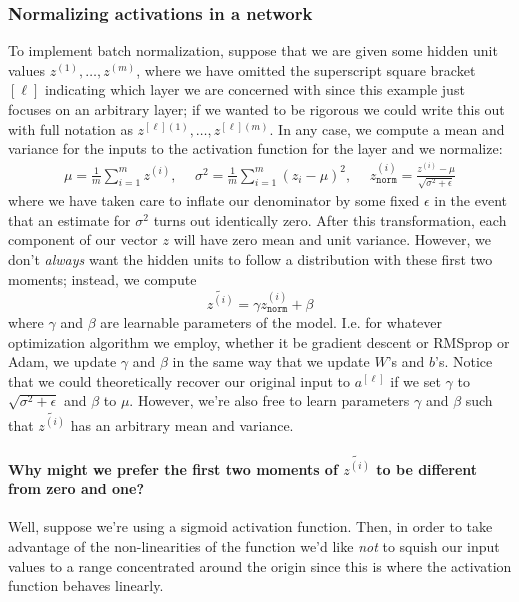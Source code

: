 \documentclass[12pt]{article}
\begin{document}
\subsubsection{Normalizing activations in a network} 
To implement batch normalization, suppose that we are given some
hidden unit values $z^{(1)}, \ldots, z^{(m)}$, where we have omitted the superscript square bracket $[\ell]$ indicating
which layer we are concerned with since this example just focuses on an arbitrary layer; if we wanted to be rigorous we could write this out with full notation as $z^{[\ell](1)}, \ldots, z^{[\ell](m)}$. In any case, we compute a mean and variance for the inputs to the activation function for the layer and we normalize:
\begin{align*}   \mu = \frac{1}{m} \sum_{i=1}^{m} z^{(i)}, \hspace{15pt}
  \sigma^2 = \frac{1}{m} \sum_{i=1}^m \left(z_i - \mu\right)^2, \hspace{15pt}
  z^{(i)}_{\texttt{norm}} = \frac{z^{(i)} - \mu}{\sqrt{\sigma^2 + \epsilon}} \end{align*}
where we have taken care to inflate our denominator by some fixed $\epsilon$ in the event that an estimate for
$\sigma^2$ turns out identically zero. After this transformation, each component of our vector $z$ will have 
zero mean and unit variance. However, we don't \emph{always} want the hidden units to follow a distribution
with these first two moments; instead, we compute
\[
\tilde{z^{(i)}} = \gamma z^{(i)}_{\texttt{norm}} + \beta
\]
where $\gamma$ and $\beta$ are learnable parameters of the model. I.e. for whatever optimization algorithm 
we employ, whether it be gradient descent or RMSprop or Adam, we update $\gamma$ and $\beta$ in the same way that
we update $W$'s and $b$'s. Notice that we could theoretically recover our original input to $a^{[\ell]}$ if we set 
$\gamma$ to $\sqrt{\sigma^2+\epsilon}$ and $\beta$ to $\mu$. However, we're also free to learn
parameters $\gamma$ and $\beta$ such that $\tilde{z^{(i)}}$ has an arbitrary mean and variance. 

\paragraph{Why might we prefer
the first two moments of $\tilde{z^{(i)}}$ to be different from zero and one?} Well, suppose we're using 
a sigmoid activation function. Then, in order to take advantage of the non-linearities of the function we'd
like \emph{not} to squish our input values to a range concentrated around the origin since this is where the 
activation function behaves linearly.
\end{document}
